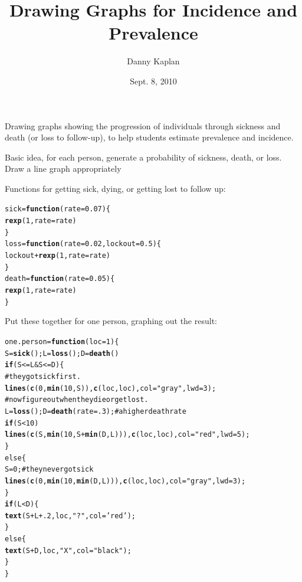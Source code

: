 \documentclass{article}\usepackage{graphicx, color}
\title{Drawing Graphs for Incidence and Prevalence}
\author{Danny Kaplan}
\date{Sept. 8, 2010}
\makeatletter
\newcommand{\hlfunctioncall}[1]{\textcolor[rgb]{0.501960784313725,0,0.329411764705882}{\textbf{#1}}}%
\newcommand{\hlstring}[1]{\textcolor[rgb]{0.6,0.6,1}{#1}}%
\newcommand{\hlcomment}[1]{\textcolor[rgb]{0.180392156862745,0.6,0.341176470588235}{#1}}%
\newenvironment{kframe}{%
 \def\at@end@of@kframe{}%
 \ifinner\ifhmode%
  \def\at@end@of@kframe{\end{minipage}}%
  \begin{minipage}{\columnwidth}%
 \fi\fi%
 \def\FrameCommand##1{\hskip\@totalleftmargin \hskip-\fboxsep
 \colorbox{shadecolor}{##1}\hskip-\fboxsep
     \hskip-\linewidth \hskip-\@totalleftmargin \hskip\columnwidth}%
 \MakeFramed {\advance\hsize-\width
   \@totalleftmargin\z@ \linewidth\hsize
   \@setminipage}}%
 {\par\unskip\endMakeFramed%
 \at@end@of@kframe}
\newenvironment{knitrout}{}{} %
\makeatother
\begin{document}
\maketitle

Drawing graphs showing the progression of individuals through sickness
and death (or loss to follow-up), to help students estimate prevalence
and incidence.

Basic idea, for each person, generate a probability of sickness,
death, or loss.  Draw a line graph appropriately

Functions for getting sick, dying, or getting lost to follow up:
\begin{knitrout}
\color{fgcolor}\begin{kframe}
\begin{alltt}
sick = \hlfunctioncall{function}(rate = 0.07) \{
    \hlfunctioncall{rexp}(1, rate = rate)
\}
loss = \hlfunctioncall{function}(rate = 0.02, lockout = 0.5) \{
    lockout + \hlfunctioncall{rexp}(1, rate = rate)
\}
death = \hlfunctioncall{function}(rate = 0.05) \{
    \hlfunctioncall{rexp}(1, rate = rate)
\}
\end{alltt}
\end{kframe}
\end{knitrout}


Put these together for one person, graphing out the result:
\begin{knitrout}
\color{fgcolor}\begin{kframe}
\begin{alltt}
one.person = \hlfunctioncall{function}(loc=1) \{
  S=\hlfunctioncall{sick}(); L=\hlfunctioncall{loss}(); D=\hlfunctioncall{death}()
  \hlfunctioncall{if}( S <= L & S <= D ) \{
    \hlcomment{# they got sick first.}
    \hlfunctioncall{lines}( \hlfunctioncall{c}(0,\hlfunctioncall{min}(10,S)), \hlfunctioncall{c}(loc,loc), col=\hlstring{"gray"}, lwd=3 );
    \hlcomment{# now figure out when they die or get lost.}
    L = \hlfunctioncall{loss}(); D=\hlfunctioncall{death}(rate=.3); \hlcomment{# a higher death rate}
    \hlfunctioncall{if} (S < 10 )
      \hlfunctioncall{lines}( \hlfunctioncall{c}(S,\hlfunctioncall{min}(10,S+\hlfunctioncall{min}(D,L))), \hlfunctioncall{c}(loc,loc), col=\hlstring{"red"}, lwd=5 );
  \}
  else \{
    S = 0; \hlcomment{# they never got sick}
    \hlfunctioncall{lines}( \hlfunctioncall{c}(0,\hlfunctioncall{min}(10,\hlfunctioncall{min}(D,L))), \hlfunctioncall{c}(loc,loc), col=\hlstring{"gray"}, lwd=3 );
  \}
  \hlfunctioncall{if}( L < D ) \{
    \hlfunctioncall{text}( S+L+.2, loc, \hlstring{"?"}, col=\hlstring{'red'});
  \}
  else \{
    \hlfunctioncall{text}( S+D, loc, \hlstring{"X"}, col=\hlstring{"black"});
  \}
\}
\end{alltt}
\end{kframe}
\end{knitrout}
\end{document}

